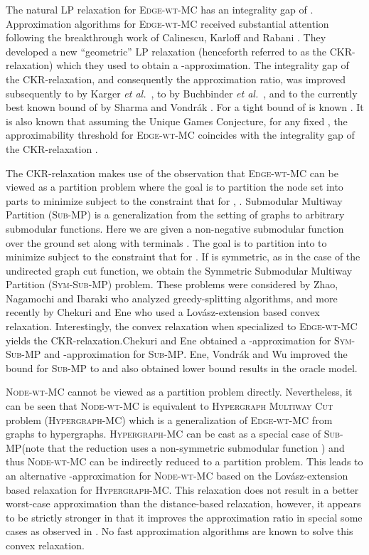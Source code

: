 \documentclass[11pt]{article}
\newcommand{\etal}{{\em et al.}~}
\def\MC{\textsc{Edge-wt-MC}\xspace}
\def\NodeMC{\textsc{Node-wt-MC}\xspace}
\def\NodeMC{\textsc{Node-wt-MC}\xspace}
\def\SubMP{\textsc{Sub-MP}\xspace}
\def\SymSubMP{\textsc{Sym-Sub-MP}\xspace}
\def\AHMCfull{\textsc{Hypergraph Multiway Cut}\xspace}
\def\AHMC{\textsc{Hypergraph-MC}\xspace}
\begin{document}
The natural LP relaxation for \MC has an integrality gap of .
Approximation algorithms for \MC received substantial attention
following the breakthrough work of Calinescu, Karloff and Rabani
\cite{CalinescuKR98}. They developed a new ``geometric'' LP relaxation
(henceforth referred to as the CKR-relaxation) which they used to
obtain a -approximation. The integrality gap of the
CKR-relaxation, and consequently the approximation ratio, was improved
subsequently to  by Karger \etal \cite{KargerKSTY99}, to
 by Buchbinder \etal \cite{BuchbinderNS13}, and to 
the currently best known bound of  by Sharma and Vondr\'ak
\cite{SharmaV14}. For  a tight bound of  is known
\cite{CheungCT06,KargerKSTY99}. It is also known that assuming the
Unique Games Conjecture, for any fixed , the approximability
threshold for \MC coincides with the integrality gap of the
CKR-relaxation \cite{ManokaranNRS08}.

The CKR-relaxation makes use of the observation that \MC can be viewed
as a partition problem where the goal is to partition the node set
 into  parts  to minimize  subject to the constraint that for ,
.  {\sc Submodular Multiway Partition} (\SubMP) is a
generalization from the setting of graphs to arbitrary submodular
functions. Here we are given a non-negative submodular function  over the ground set  along with terminals
.  The goal is to partition  into
 to minimize  subject to the
constraint that  for .  If  is
symmetric, as in the case of the undirected graph cut function, we
obtain the {\sc Symmetric Submodular Multiway Partition} (\SymSubMP)
problem. These problems were considered by Zhao, Nagamochi and Ibaraki
\cite{ZhaoNI05} who analyzed greedy-splitting algorithms, and more
recently by Chekuri and Ene \cite{ChekuriE11b} who used a
Lov\'asz-extension based convex relaxation. Interestingly, the convex
relaxation when specialized to \MC yields the CKR-relaxation.Chekuri and Ene
\cite{ChekuriE11b} obtained a -approximation for \SymSubMP
and -approximation for \SubMP. Ene, Vondr\'ak and Wu \cite{EneVW13}
improved the bound for \SubMP to  and also obtained
lower bound results in the oracle model.

\NodeMC cannot be viewed as a partition problem
directly. Nevertheless, it can be seen that \NodeMC
is equivalent to \AHMCfull problem (\AHMC) which is a generalization
of \MC from graphs to hypergraphs. \AHMC can be
cast as a special case of \SubMP (note that the reduction uses a
non-symmetric submodular function ) and thus \NodeMC can be
indirectly reduced to a partition problem. This leads to an
alternative -approximation for \NodeMC based on the
Lov\'asz-extension based relaxation for \AHMC. This relaxation does
not result in a better worst-case approximation than the
distance-based relaxation, however, it appears to be strictly stronger
in that it improves the approximation ratio in special some cases as
observed in \cite{ChekuriE11}. No fast approximation
algorithms are known to solve this convex relaxation.
\end{document}
